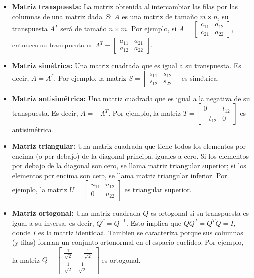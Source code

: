 \begin{definición}
\begin{itemize}
        \item \textbf{Matriz transpuesta:} La matriz obtenida al intercambiar las filas por las columnas de una matriz dada. Si \( A \) es una matriz de tamaño \( m \times n \), su transpuesta \( A^T \) será de tamaño \( n \times m \). Por ejemplo, si \( A = \begin{bmatrix} a_{11} & a_{12} \\ a_{21} & a_{22} \end{bmatrix} \), entonces su transpuesta es \( A^T = \begin{bmatrix} a_{11} & a_{21} \\ a_{12} & a_{22} \end{bmatrix} \).
        \item \textbf{Matriz simétrica:} Una matriz cuadrada que es igual a su transpuesta. Es decir, \( A = A^T \). Por ejemplo, la matriz \( S = \begin{bmatrix} s_{11} & s_{12} \\ s_{12} & s_{22} \end{bmatrix} \) es simétrica.
        \item \textbf{Matriz antisimétrica:} Una matriz cuadrada que es igual a la negativa de su transpuesta. Es decir, \( A = -A^T \). Por ejemplo, la matriz \( T = \begin{bmatrix} 0 & t_{12} \\ -t_{12} & 0 \end{bmatrix} \) es antisimétrica.
        \item \textbf{Matriz triangular:} Una matriz cuadrada que tiene todos los elementos por encima (o por debajo) de la diagonal principal iguales a cero. Si los elementos por debajo de la diagonal son cero, se llama matriz triangular superior; si los elementos por encima son cero, se llama matriz triangular inferior. Por ejemplo, la matriz \( U = \begin{bmatrix} u_{11} & u_{12} \\ 0 & u_{22} \end{bmatrix} \) es triangular superior.
        \item \textbf{Matriz ortogonal:} Una matriz cuadrada \( Q \) es ortogonal si su transpuesta es igual a su inversa, es decir, \( Q^T = Q^{-1} \). Esto implica que \( Q Q^T = Q^T Q = I \), donde \( I \) es la matriz identidad. Tambien se caracteriza porque sus columnas (y filas) forman un conjunto ortonormal en el espacio euclídeo. Por ejemplo, la matriz \( Q = \begin{bmatrix} \frac{1}{\sqrt{2}} & -\frac{1}{\sqrt{2}} \\ \frac{1}{\sqrt{2}} & \frac{1}{\sqrt{2}} \end{bmatrix} \) es ortogonal.

\end{itemize}
\end{definición}
